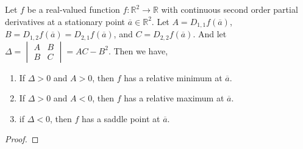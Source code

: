 \begin{theorem}
	Let $f$ be a real-valued function $f : \mathbb{R}^2 \to \mathbb{R}$ with continuous second order partial derivatives at a stationary point $\overline{a} \in \mathbb{R}^2$. Let $A = D_{1,1}f(\overline{a})$, $B = D_{1,2}f(\overline{a}) = D_{2,1}f(\overline{a})$, and $C = D_{2,2}f(\overline{a})$. And let $\Delta = \begin{vmatrix}A & B \\ B & C \end{vmatrix} = AC - B^2$. Then we have,
		\begin{enumerate}
			\item If $\Delta > 0$ and $A > 0$, then $f$ has a relative minimum at $\overline{a}$.
			\item If $\Delta > 0$ and $A < 0$, then $f$ has a relative maximum at $\overline{a}$.
			\item if $\Delta < 0$, then $f$ has a saddle point at $\overline{a}$.
		\end{enumerate}
\end{theorem}
\begin{proof}
\end{proof}









